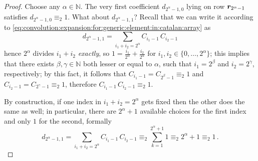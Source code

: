 \begin{proof}
    Choose any $\alpha\in\mathbb{N}$. The very first coefficient $d_{2^{\alpha}-1,0}$
    lying on row $\boldsymbol{r}_{2^{\alpha}-1}$ satisfies $d_{2^{\alpha}-1,0}\equiv_{2}1$. 
    What about $d_{2^{\alpha}-1,1}$?  Recall that we can write it according to
    \autoref{eq:convolution:expansion:for:generic:element:in:catalan:array} as
    \begin{displaymath}
        d_{2^{\alpha}-1,1} = \sum_{i_{1}+ i_{2}=2^{\alpha}}{ C_{i_{1}-1}\,C_{i_{2}-1} }
    \end{displaymath}
    hence %
    $2^{\alpha}$ divides $i_{1}+i_{2}$ \emph{exactly}, so
    $\displaystyle 1 = \frac{i_{1}}{2^{\alpha}}+\frac{i_{2}}{2^{\alpha}}$ for 
            $i_{1},i_{2}\in\lbrace 0,\ldots,2^{\alpha}\rbrace$;
    this implies that there exists $\beta,\gamma\in\mathbb{N}$ both lesser or
    equal to  $\alpha$, such that $i_{1}=2^{\beta}$ and $i_{2}=2^{\gamma}$,
    respectively; by this fact, it follows that $C_{i_{1}-1}=C_{2^{\beta}-1}\equiv_{2}1$ and
    $C_{i_{2}-1}=C_{2^{\gamma}-1}\equiv_{2}1$, therefore $C_{i_{1}-1}\,C_{i_{2}-1}\equiv_{2}1$.

    By construction, if one index in
    $i_{1}+ i_{2}=2^{\alpha}$ gets fixed then the other does the same as well;
    in particular, there are $2^{\alpha}+1$ available choices for the first index and only 
    $1$ for the second, formally
    \begin{displaymath}
        d_{2^{\alpha}-1,1} = \sum_{i_{1}+ i_{2}=2^{\alpha}}{ C_{i_{1}-1}\,C_{i_{2}-1} }
            \equiv_{2} \sum_{k=1}^{2^{\alpha}+1}{1}\equiv_{2} 2^{\alpha}+1\equiv_{2} 1\,.
    \end{displaymath}


\end{proof}
